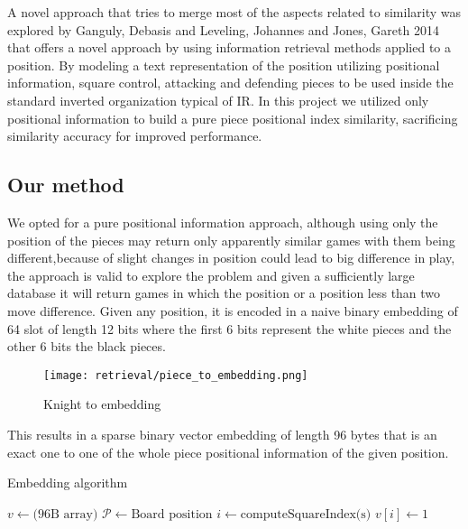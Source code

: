 A novel approach that tries to merge most of the aspects related to similarity was explored by 
Ganguly, Debasis and Leveling, Johannes and Jones, Gareth 2014 \cite{retrieval:soa:ids} 
that offers a novel approach by using information retrieval methods applied to a position.
By modeling a text representation of the position utilizing positional information, square control, attacking and defending pieces 
to be used inside the standard inverted organization typical of IR. 
\newline
In this project we utilized only positional information to build a pure piece positional index similarity, sacrificing similarity accuracy
for improved performance.
\subsection{Our method}
We opted for a pure positional information approach, although using only the position of the pieces may 
return only apparently similar games with them being different,because of slight changes in position 
could lead to big difference in play, the approach is valid to explore the problem 
and given a sufficiently large database it will return games in which the position or a position less than two move difference. 
\newline
Given any position, it is encoded in a naive binary embedding of 64 slot of length 12 bits where the first 6 bits represent the white pieces 
and the other 6 bits the black pieces.
\begin{figure}[ht]
\centering
\texttt{[image: retrieval/piece\_to\_embedding.png]}
\caption{Knight to embedding}
\label{fig:retrieval:piecetoembedding}
\end{figure}
\newline
This results in a sparse binary vector embedding of length 96 bytes that is an exact one to one of the whole 
piece positional information of the given position.

\begin{algorithm}[H]
\caption{Embedding algorithm}\label{retrieval:embedding:algorithm}
\begin{algorithmic}
\State $v \gets \text{(96B array)}$
\State $\mathcal P \gets \text{Board position}$
    \State $i \gets \text{computeSquareIndex(s)}$
    \State $v[i] \gets 1$
\EndIf
\EndFor
\end{algorithmic}
\end{algorithm}

